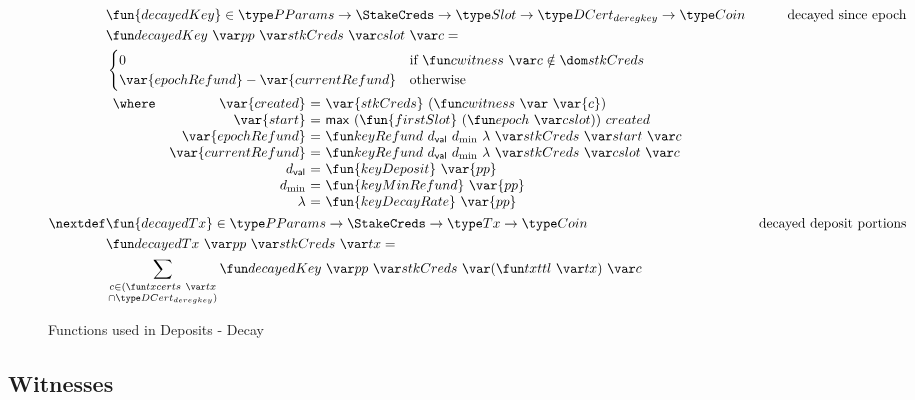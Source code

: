 \begin{figure}[htb]
  \begin{align*}
      & \fun{decayedKey} \in
      \PParams \to \StakeCreds \to \Slot \to \DCertDeRegKey \to \Coin
      & \text{decayed since epoch} \\
      & \decayedKey{pp}{stkCreds}{cslot}{c} =\\
      & \begin{cases}
            0 & \text{if}~\cwitness c \notin \dom stkCreds\\
            \var{epochRefund} - \var{currentRefund}
            & \text{otherwise}
        \end{cases}\\
      &
      \begin{array}{lr@{~=~}l}
        \where
          & \var{created} & \var{stkCreds}~(\cwitness~\var{c}) \\
          & \var{start} & \mathsf{max}~(\fun{firstSlot}~(\epoch{cslot}))~created \\
          & \var{epochRefund} & \keyRefund{\dval}{d_{\min}}{\lambda}{stkCreds}{start}{c} \\
          & \var{currentRefund} & \keyRefund{\dval}{d_{\min}}{\lambda}{stkCreds}{cslot}{c} \\
          & \dval & \fun{keyDeposit}~\var{pp}\\
          & d_{\min} & \fun{keyMinRefund}~\var{pp}\\
          & \lambda & \fun{keyDecayRate}~\var{pp}\\
      \end{array}\\
      \nextdef
      & \fun{decayedTx} \in \PParams \to \StakeCreds \to \Tx \to \Coin
      & \text{decayed deposit portions} \\
      & \decayedTx{pp}{stkCreds}{tx} =\\
      &   \sum\limits_{\substack{c \in (\txcerts{tx} \\ \cap \DCertDeRegKey)}}
          \decayedKey{pp}{stkCreds}{(\txttl{tx})}{c}\\
  \end{align*}
  \caption{Functions used in Deposits - Decay}
  \label{fig:functions:deposits-decay}
\end{figure}

\clearpage

\subsection{Witnesses}
\label{sec:witnesses-shelley}


